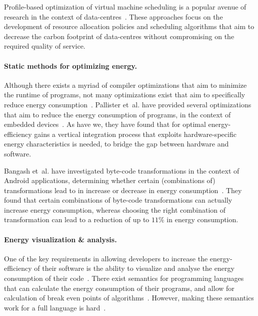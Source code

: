 Profile-based optimization of virtual machine scheduling is a popular avenue of research in the context of data-centres~\cite{profile-based1,profile-based2,profile-based3,profile-based4}.
These approaches focus on the development of resource allocation policies and scheduling algorithms that aim to decrease the carbon footprint of data-centres without compromising on the required quality of service.

\paragraph{Static methods for optimizing energy.}

Although there exists a myriad of compiler optimizations that aim to minimize the runtime of programs, not many optimizations exist that aim to specifically reduce energy consumption~\cite{compiler-energy-differences}.
Pallister et~al. have provided several optimizations that aim to reduce the energy consumption of programs, in the context of embedded devices~\cite{compiler-energy-flash,compiler-energy-methods}.
As have we, they have found that for optimal energy-efficiency gains a vertical integration process that exploits hardware-specific energy characteristics is needed, to bridge the gap between hardware and software.

Bangash et~al. have investigated byte-code transformations in the context of Android applications, determining whether certain (combinations of) transformations lead to in increase or decrease in energy consumption~\cite{compiler-energy-android}.
They found that certain combinations of byte-code transformations can actually increase energy consumption, whereas choosing the right combination of transformation can lead to a reduction of up to $11\%$ in energy consumption.

\paragraph{Energy visualization \& analysis.}

One of the key requirements in allowing developers to increase the energy-efficiency of their software is the ability to visualize and analyse the energy consumption of their code~\cite{van2023organizational}.
There exist semantics for programming languages that can calculate the energy consumption of their programs, and allow for calculation of break even points of algorithms~\cite{symbolic-dependent-types,symbolic-dependent-types2,phdBernard}.
However, making these semantics work for a full language is hard~\cite{energy-analysis}.

